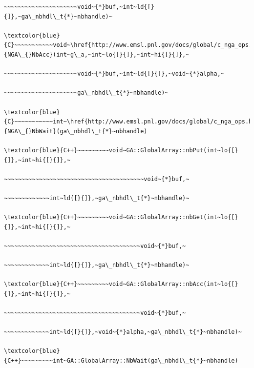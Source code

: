 \begin{verbatim}
~~~~~~~~~~~~~~~~~~~~~void~{*}buf,~int~ld{[}{]},~ga\_nbhdl\_t{*}~nbhandle)~

\textcolor{blue}{C}~~~~~~~~~~~void~\href{http://www.emsl.pnl.gov/docs/global/c_nga_ops.html\#ga_nbacc}{NGA\_{}NbAcc}(int~g\_a,~int~lo{[}{]},~int~hi{[}{]},~

~~~~~~~~~~~~~~~~~~~~~void~{*}buf,~int~ld{[}{]},~void~{*}alpha,~

~~~~~~~~~~~~~~~~~~~~~ga\_nbhdl\_t{*}~nbhandle)~

\textcolor{blue}{C}~~~~~~~~~~~int~\href{http://www.emsl.pnl.gov/docs/global/c_nga_ops.html\#ga_nbwait}{NGA\_{}NbWait}(ga\_nbhdl\_t{*}~nbhandle)

\textcolor{blue}{C++}~~~~~~~~~void~GA::GlobalArray::nbPut(int~lo{[}{]},~int~hi{[}{]},~

~~~~~~~~~~~~~~~~~~~~~~~~~~~~~~~~~~~~~~~~void~{*}buf,~

~~~~~~~~~~~~~int~ld{[}{]},~ga\_nbhdl\_t{*}~nbhandle)~

\textcolor{blue}{C++}~~~~~~~~~void~GA::GlobalArray::nbGet(int~lo{[}{]},~int~hi{[}{]},~

~~~~~~~~~~~~~~~~~~~~~~~~~~~~~~~~~~~~~~~void~{*}buf,~

~~~~~~~~~~~~~int~ld{[}{]},~ga\_nbhdl\_t{*}~nbhandle)~

\textcolor{blue}{C++}~~~~~~~~~void~GA::GlobalArray::nbAcc(int~lo{[}{]},~int~hi{[}{]},~

~~~~~~~~~~~~~~~~~~~~~~~~~~~~~~~~~~~~~~~void~{*}buf,~

~~~~~~~~~~~~~int~ld{[}{]},~void~{*}alpha,~ga\_nbhdl\_t{*}~nbhandle)~

\textcolor{blue}{C++}~~~~~~~~~int~GA::GlobalArray::NbWait(ga\_nbhdl\_t{*}~nbhandle)
\end{verbatim}

